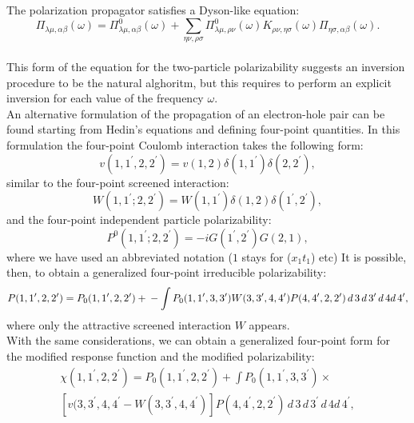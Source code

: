 \documentclass[11pt]{article}
\begin{document}
The polarization propagator satisfies a Dyson-like equation:
\begin{equation}\label{polprop}
\Pi_{\lambda \mu,\alpha \beta}(\omega) = \Pi^{0}_{\lambda \mu,\alpha \beta}(\omega) + 
\sum_{\eta\nu,\rho\sigma}\Pi^{0}_{\lambda \mu,\rho \nu}(\omega)K_{\rho\nu,\eta\sigma}(\omega)
\Pi_{\eta \sigma,\alpha \beta}(\omega).
\end{equation}
\\
This form of the equation for the two-particle polarizability suggests an 
inversion procedure to be the natural alghoritm, but this requires to perform an explicit inversion for
each value of the frequency $\omega$.
\\
An alternative formulation of the propagation of an electron-hole pair can be found starting from Hedin's equations
and defining four-point quantities. 
In this formulation the four-point Coulomb interaction takes the following form:
\begin{equation}
v(1,1^{\prime},2,2^{\prime}) =  v(1,2)\delta(1,1^{\prime})\delta(2,2^{\prime}),
\end{equation}
similar to the four-point screened interaction:
\begin{equation}
W(1,1^{\prime};2,2^{\prime}) =  W(1,1^{\prime})\delta(1,2)\delta(1^{\prime},2^{\prime}),
\end{equation}
and the four-point independent particle polarizability:
\begin{equation}
P^{0}(1,1^{\prime};2,2^{\prime}) = -iG(1^{\prime},2^{\prime})G(2,1),
\end{equation}
where we have used an abbreviated notation ($1$ stays for ($x_1t_1$) etc) 
It is possible, then, to obtain a generalized
four-point irreducible polarizability:
\begin{equation}
P(1,1^{\prime},2,2^{\prime}) = P_{0}(1,1^{\prime},2,2^{\prime}) + \\
- \int P_{0}(1,1^{\prime},3,3^{\prime})W(3,3^{\prime},4,4^{\prime})P(4,4^{\prime},2,2^{\prime})\,d\,3\,d\,3^{\prime}\,d\,4d\,4^{\prime},
\end{equation}
where only the attractive screened interaction $W$ appears.\\
With the same considerations, we can obtain a generalized four-point form for the
modified response function and the modified polarizability:
\begin{multline}\label{modchiquatt}
\chi(1,1^{\prime},2,2^{\prime}) = P_{0}(1,1^{\prime},2,2^{\prime}) + \int P_{0}(1,1^{\prime},3,3^{\prime})\times \\
\left[ v(3,3^{\prime},4,4^{\prime} - W(3,3^{\prime},4,4^{\prime})\right] P(4,4^{\prime},2,2^{\prime})\,d\,3\,d\,3^{\prime}\,d\,4d\,4^{\prime},
\end{multline}
\end{document}

